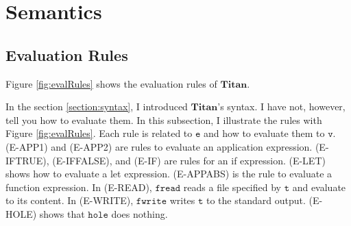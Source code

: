 \documentclass[12pt, a4paper, titlepage]{report}
\begin{document}
  \section{Semantics}
    \subsection{Evaluation Rules}
      Figure \ref{fig:evalRules} shows the evaluation rules of $\mathbf{Titan}$.

      In the section \ref{section:syntax}, I introduced $\mathbf{Titan}$'s syntax.
      I have not, however, tell you how to evaluate them.
      In this subsection, I illustrate the rules with Figure \ref{fig:evalRules}.
      Each rule is related to $\mathtt{e}$ and how to evaluate them to $\mathtt{v}$.
      (\textrm{E-APP1}) and (\textrm{E-APP2}) are rules to evaluate an application expression.
      (\textrm{E-IFTRUE}), (\textrm{E-IFFALSE}), and (\textrm{E-IF}) are rules for an if expression.
      (\textrm{E-LET}) shows how to evaluate a let expression.
      (\textrm{E-APPABS}) is the rule to evaluate a function expression.
      In (\textrm{E-READ}), $\mathtt{fread}$ reads a file specified by $\mathtt{t}$ and evaluate to its content.
      In (\textrm{E-WRITE}), $\mathtt{fwrite}$ writes $\mathtt{t}$ to the standard output.
      (\textrm{E-HOLE}) shows that $\mathtt{hole}$ does nothing.
\end{document}
